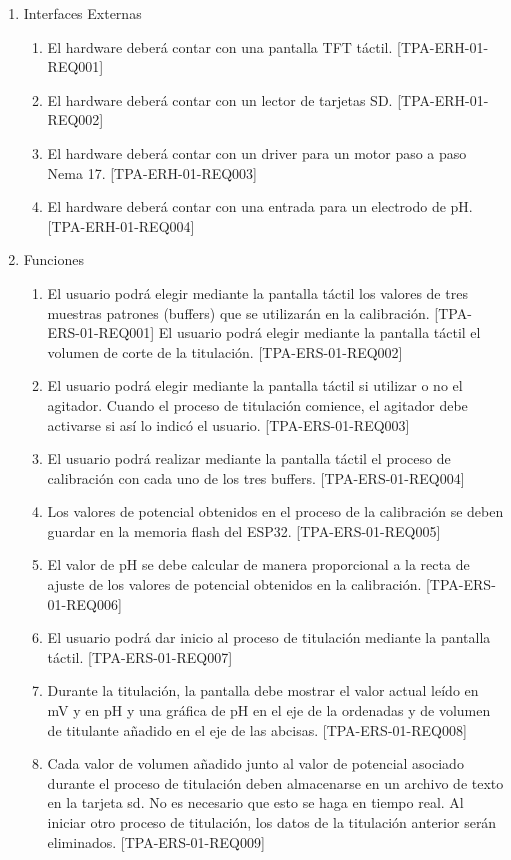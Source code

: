 \documentclass[11pt]{charter}
\begin{document}
\begin{enumerate}
\item Interfaces Externas
	\begin{enumerate}
	\item El hardware deberá contar con una pantalla TFT táctil. [TPA-ERH-01-REQ001]
	\item El hardware deberá contar con un lector de tarjetas SD. [TPA-ERH-01-REQ002]
	\item El hardware deberá contar con un driver para un motor paso a paso Nema 17. [TPA-ERH-01-REQ003]
	\item El hardware deberá contar con una entrada para un electrodo de pH. [TPA-ERH-01-REQ004]
\end{enumerate}
	
\item Funciones
	\begin{enumerate}
	\item El usuario podrá elegir mediante la pantalla táctil los valores de tres muestras patrones (buffers) que se utilizarán en la calibración. [TPA-ERS-01-REQ001]
El usuario podrá elegir mediante la pantalla táctil el volumen de corte de la titulación. [TPA-ERS-01-REQ002]
	\item El usuario podrá elegir mediante la pantalla táctil si utilizar o no el agitador. Cuando el proceso de titulación comience, el agitador debe activarse si así lo indicó el usuario. [TPA-ERS-01-REQ003]
	\item El usuario podrá realizar mediante la pantalla táctil el proceso de calibración con cada uno de los tres buffers. [TPA-ERS-01-REQ004]
	\item Los valores de potencial obtenidos en el proceso de la calibración se deben guardar en la memoria flash del ESP32. [TPA-ERS-01-REQ005]
	\item El valor de pH se debe calcular de manera proporcional a la recta de ajuste de los valores de potencial obtenidos en la calibración. [TPA-ERS-01-REQ006]
	\item El usuario podrá dar inicio al proceso de titulación mediante la pantalla táctil. [TPA-ERS-01-REQ007]
	\item Durante la titulación, la pantalla debe mostrar el valor actual leído en mV y en pH y una gráfica de pH en el eje de la ordenadas y de volumen de titulante añadido en el eje de las abcisas. [TPA-ERS-01-REQ008]
	\item Cada valor de volumen añadido junto al valor de potencial asociado durante el proceso de titulación deben almacenarse en un archivo de texto en la tarjeta sd. No es necesario que esto se haga en tiempo real. Al iniciar otro proceso de titulación, los datos de la titulación anterior serán eliminados. [TPA-ERS-01-REQ009]

\end{enumerate}
\end{enumerate}
\end{document}
